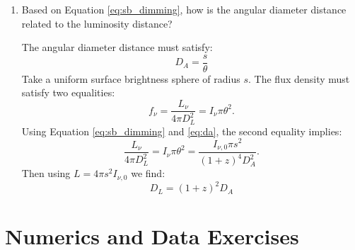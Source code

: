 \begin{enumerate}
\item Based on Equation \ref{eq:sb_dimming}, how is the angular
  diameter distance related to the luminosity distance? 

\begin{answer}
The angular diameter distance must satisfy:
\begin{equation}
\label{eq:da}
D_A = \frac{s}{\theta}
\end{equation}
Take a uniform surface brightness sphere of radius $s$. The flux
density must satisfy two equalities:
\begin{equation}
f_\nu = \frac{L_\nu}{4\pi D_L^2} = I_\nu \pi \theta^2.
\end{equation}
Using Equation \ref{eq:sb_dimming} and \ref{eq:da}, the second equality
implies:
\begin{equation}
\frac{L_\nu}{4\pi D_L^2} = I_\nu \pi \theta^2 = \frac{I_{\nu, 0} \pi
s^2}{(1+z)^4 D_A^2}.
\end{equation}
Then using $L=4\pi s^2 I_{\nu, 0}$ we find:
\begin{equation}
D_L = (1+z)^2 D_A
\end{equation}
\end{answer}
\end{enumerate}

\section{Numerics and Data Exercises}

